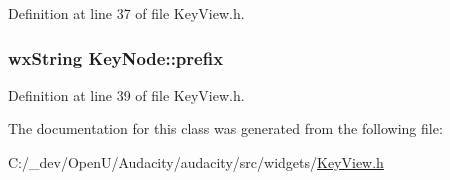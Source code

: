 Definition at line 37 of file Key\+View.\+h.

\subsubsection[{\texorpdfstring{prefix}{prefix}}]{\setlength{\rightskip}{0pt plus 5cm}wx\+String Key\+Node\+::prefix}\hypertarget{class_key_node_ad7f0ad2f83e1adc8135d0e539fadca87}{}\label{class_key_node_ad7f0ad2f83e1adc8135d0e539fadca87}


Definition at line 39 of file Key\+View.\+h.



The documentation for this class was generated from the following file\+:\begin{DoxyCompactItemize}
\item 
C\+:/\+\_\+dev/\+Open\+U/\+Audacity/audacity/src/widgets/\hyperlink{_key_view_8h}{Key\+View.\+h}\end{DoxyCompactItemize}
